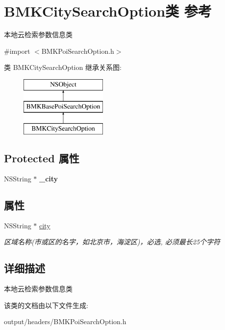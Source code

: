 \hypertarget{interface_b_m_k_city_search_option}{}\section{B\+M\+K\+City\+Search\+Option类 参考}
\label{interface_b_m_k_city_search_option}


本地云检索参数信息类  




{\ttfamily \#import $<$B\+M\+K\+Poi\+Search\+Option.\+h$>$}

类 B\+M\+K\+City\+Search\+Option 继承关系图\+:\begin{figure}[H]
\begin{center}
\leavevmode
\includegraphics[height=3.000000cm]{interface_b_m_k_city_search_option}
\end{center}
\end{figure}
\subsection*{Protected 属性}
\begin{DoxyCompactItemize}
\item 
\hypertarget{interface_b_m_k_city_search_option_a6d14cd2f7fcac7cd601ef9bfd0439720}{}N\+S\+String $\ast$ {\bfseries \+\_\+city}\label{interface_b_m_k_city_search_option_a6d14cd2f7fcac7cd601ef9bfd0439720}

\end{DoxyCompactItemize}
\subsection*{属性}
\begin{DoxyCompactItemize}
\item 
\hypertarget{interface_b_m_k_city_search_option_af9e2e37c3edcd43445f58660e770f8b1}{}N\+S\+String $\ast$ \hyperlink{interface_b_m_k_city_search_option_af9e2e37c3edcd43445f58660e770f8b1}{city}\label{interface_b_m_k_city_search_option_af9e2e37c3edcd43445f58660e770f8b1}

\begin{DoxyCompactList}\small\item\em 区域名称(市或区的名字，如北京市，海淀区)，必选, 必须最长25个字符 \end{DoxyCompactList}\end{DoxyCompactItemize}


\subsection{详细描述}
本地云检索参数信息类 

该类的文档由以下文件生成\+:\begin{DoxyCompactItemize}
\item 
output/headers/B\+M\+K\+Poi\+Search\+Option.\+h\end{DoxyCompactItemize}
